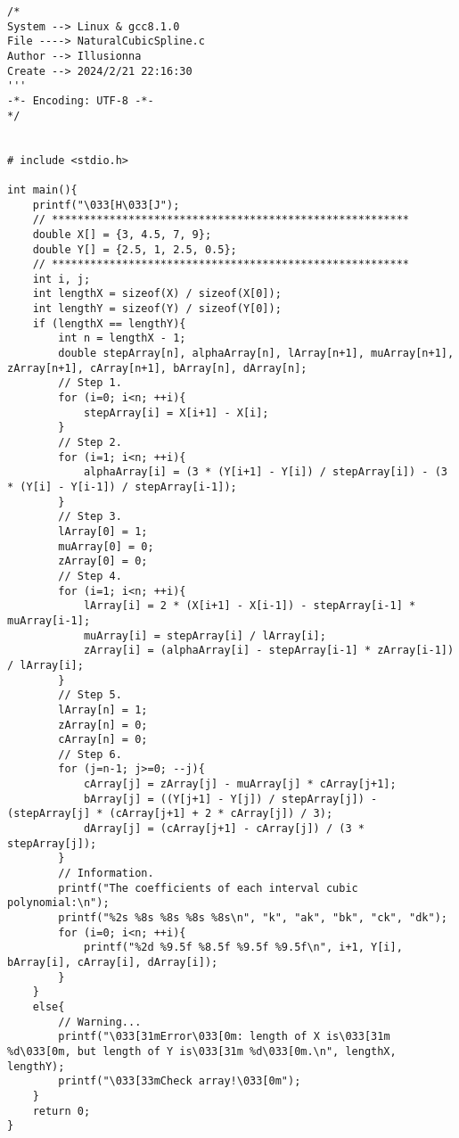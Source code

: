 \documentclass[oneside,UTF8]{article}
\numberwithin{figure}{section}
\numberwithin{table}{section}
\numberwithin{equation}{section}
\begin{document}
\begin{lstlisting}
/*
System --> Linux & gcc8.1.0
File ----> NaturalCubicSpline.c
Author --> Illusionna
Create --> 2024/2/21 22:16:30
'''
-*- Encoding: UTF-8 -*-
*/


# include <stdio.h>

int main(){
    printf("\033[H\033[J");
    // ********************************************************
    double X[] = {3, 4.5, 7, 9};
    double Y[] = {2.5, 1, 2.5, 0.5};
    // ********************************************************
    int i, j;
    int lengthX = sizeof(X) / sizeof(X[0]);
    int lengthY = sizeof(Y) / sizeof(Y[0]);
    if (lengthX == lengthY){
        int n = lengthX - 1;
        double stepArray[n], alphaArray[n], lArray[n+1], muArray[n+1], zArray[n+1], cArray[n+1], bArray[n], dArray[n];
        // Step 1.
        for (i=0; i<n; ++i){
            stepArray[i] = X[i+1] - X[i];
        }
        // Step 2.
        for (i=1; i<n; ++i){
            alphaArray[i] = (3 * (Y[i+1] - Y[i]) / stepArray[i]) - (3 * (Y[i] - Y[i-1]) / stepArray[i-1]);
        }
        // Step 3.
        lArray[0] = 1;
        muArray[0] = 0;
        zArray[0] = 0;
        // Step 4.
        for (i=1; i<n; ++i){
            lArray[i] = 2 * (X[i+1] - X[i-1]) - stepArray[i-1] * muArray[i-1];
            muArray[i] = stepArray[i] / lArray[i];
            zArray[i] = (alphaArray[i] - stepArray[i-1] * zArray[i-1]) / lArray[i];
        }
        // Step 5.
        lArray[n] = 1;
        zArray[n] = 0;
        cArray[n] = 0;
        // Step 6.
        for (j=n-1; j>=0; --j){
            cArray[j] = zArray[j] - muArray[j] * cArray[j+1];
            bArray[j] = ((Y[j+1] - Y[j]) / stepArray[j]) - (stepArray[j] * (cArray[j+1] + 2 * cArray[j]) / 3);
            dArray[j] = (cArray[j+1] - cArray[j]) / (3 * stepArray[j]);
        }
        // Information.
        printf("The coefficients of each interval cubic polynomial:\n");
        printf("%2s %8s %8s %8s %8s\n", "k", "ak", "bk", "ck", "dk");
        for (i=0; i<n; ++i){
            printf("%2d %9.5f %8.5f %9.5f %9.5f\n", i+1, Y[i], bArray[i], cArray[i], dArray[i]);
        }
    }
    else{
        // Warning...
        printf("\033[31mError\033[0m: length of X is\033[31m %d\033[0m, but length of Y is\033[31m %d\033[0m.\n", lengthX, lengthY);
        printf("\033[33mCheck array!\033[0m");
    }
    return 0;
}
\end{lstlisting}
\end{document}
